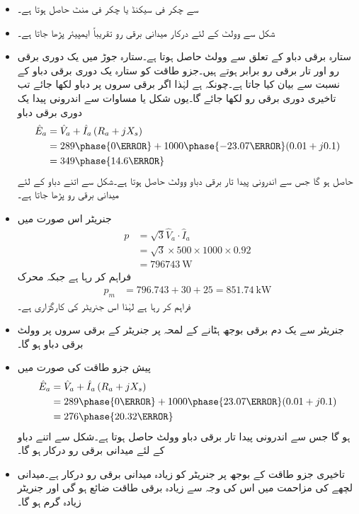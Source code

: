\begin{itemize}
\item
{} سے  چکر فی سیکنڈ یا  چکر فی منٹ حاصل ہوتا ہے۔
\item
شکل   سے    وولٹ کے لئے درکار میدانی برقی رو تقریباً  ایمپیئر پڑھا جاتا  ہے۔
\item
ستارہ برقی دباو کے تعلق  سے   وولٹ حاصل ہوتا ہے۔ستارہ جوڑ میں یک دوری برقی رو اور تار برقی رو برابر ہوتے ہیں۔جزو طاقت کو ستارہ یک دوری برقی دباو کے نسبت سے بیان کیا جاتا ہے۔چونکہ  ہے لہٰذا اگر برقی سروں پر دباو  لکھا جائے تب تاخیری دوری برقی رو   لکھا جائے گا۔یوں شکل  یا مساوات  سے اندرونی پیدا یک دوری برقی دباو
\begin{align*}
\hat{E}_a&=\hat{V}_{a}+\hat{I}_a \left(R_a+j X_s \right)\\
&= 289\phase{0 \degree}+1000 \phase {-23.07 \degree} ( 0.01 +j 0.1)\\
&=349\phase{14.6 \degree}
\end{align*}
حاصل ہو گا جس سے اندرونی پیدا تار برقی دباو  وولٹ حاصل ہوتا ہے۔شکل  سے اتنے دباو کے لئے   میدانی برقی رو پڑھا جاتا ہے۔
\item
جنریٹر اس صورت میں
\begin{align*}
p&=\sqrt{3} \hat{V}_{a} \cdot \hat{I}_a\\
&=\sqrt{3} \times 500 \times 1000 \times 0.92\\
&=\SI{796743}{\watt}
\end{align*}
فراہم کر رہا ہے جبکہ محرک 
\begin{align*}
p_m&=796.743+30+25=\SI{851.74}{\kilo \watt}
\end{align*}
فراہم کر رہا ہے لہٰذا اس جنریٹر کی کارگزاری  ہے۔
\item
جنریٹر سے یک دم برقی بوجھ ہٹانے کے  لمحہ پر جنریٹر کے برقی سروں پر   وولٹ برقی دباو ہو گا۔
\item
پیش جزو طاقت کی صورت میں
\begin{align*}
\hat{E}_a&=\hat{V}_{a}+\hat{I}_a \left(R_a+j X_s \right)\\
&= 289\phase{0 \degree}+1000 \phase {23.07 \degree} ( 0.01 +j 0.1)\\
&=276\phase{20.32 \degree}
\end{align*}
ہو گا جس سے اندرونی پیدا تار برقی دباو  وولٹ حاصل ہوتا ہے۔شکل  سے اتنے دباو کے لئے   میدانی برقی رو درکار ہو گا۔
\item
تاخیری جزو طاقت کے بوجھ پر جنریٹر کو زیادہ میدانی برقی رو درکار ہے۔میدانی لچھے کی مزاحمت میں اس کی وجہ سے زیادہ برقی طاقت ضائع ہو گی اور جنریٹر  زیادہ گرم ہو گا۔
\end{itemize}
